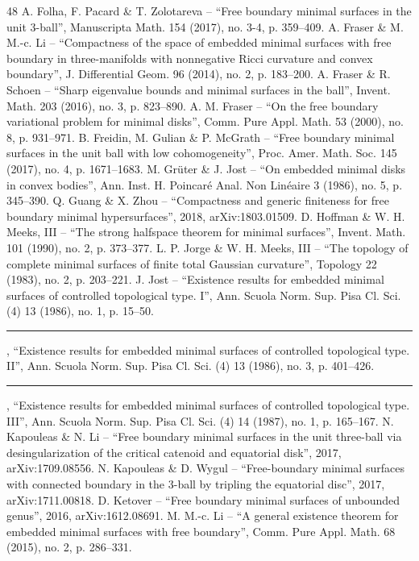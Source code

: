 \documentclass[10pt]{article}
\theoremstyle{definition}\newtheorem{definition}[thm]{Definition}
\numberwithin{equation}{section}
\begin{document}
\begin{thebibliography}{48}
 A. Folha, F. Pacard \& T. Zolotareva – “Free boundary minimal surfaces in the unit 3-ball”, Manuscripta Math. 154 (2017), no. 3-4, p. 359–409.
 A. Fraser \& M. M.-c. Li – “Compactness of the space of embedded minimal surfaces with free boundary in three-manifolds with nonnegative Ricci curvature and convex boundary”, J. Differential Geom. 96 (2014), no. 2, p. 183–200.
 A. Fraser \& R. Schoen – “Sharp eigenvalue bounds and minimal surfaces in the ball”, Invent. Math. 203 (2016), no. 3, p. 823–890.
 A. M. Fraser – “On the free boundary variational problem for minimal disks”, Comm. Pure Appl. Math. 53 (2000), no. 8, p. 931–971.
 B. Freidin, M. Gulian \& P. McGrath – “Free boundary minimal surfaces in the unit ball with low cohomogeneity”, Proc. Amer. Math. Soc. 145 (2017), no. 4, p. 1671–1683.
 M. Grüter \& J. Jost – “On embedded minimal disks in convex bodies”, Ann. Inst. H. Poincaré Anal. Non Linéaire 3 (1986), no. 5, p. 345–390.
 Q. Guang \& X. Zhou – “Compactness and generic ﬁniteness for free boundary minimal hypersurfaces”, 2018, arXiv:1803.01509.
 D. Hoffman \& W. H. Meeks, III – “The strong halfspace theorem for minimal surfaces”, Invent. Math. 101 (1990), no. 2, p. 373–377.
 L. P. Jorge \& W. H. Meeks, III – “The topology of complete minimal surfaces of ﬁnite total Gaussian curvature”, Topology 22 (1983), no. 2, p. 203–221.
 J. Jost – “Existence results for embedded minimal surfaces of controlled topological type. I”, Ann. Scuola Norm. Sup. Pisa Cl. Sci. (4) 13 (1986), no. 1, p. 15–50.
 \rule{2em}{.3pt} , “Existence results for embedded minimal surfaces of controlled topological type. II”, Ann. Scuola Norm. Sup. Pisa Cl. Sci. (4) 13 (1986), no. 3, p. 401–426.
 \rule{2em}{.3pt} , “Existence results for embedded minimal surfaces of controlled topological type. III”, Ann. Scuola Norm. Sup. Pisa Cl. Sci. (4) 14 (1987), no. 1, p. 165–167.
 N. Kapouleas \& N. Li – “Free boundary minimal surfaces in the unit three-ball via desingularization of the critical catenoid and equatorial disk”, 2017, arXiv:1709.08556.
 N. Kapouleas \& D. Wygul – “Free-boundary minimal surfaces with connected boundary in the 3-ball by tripling the equatorial disc”, 2017, arXiv:1711.00818.
 D. Ketover – “Free boundary minimal surfaces of unbounded genus”, 2016, arXiv:1612.08691.
 M. M.-c. Li – “A general existence theorem for embedded minimal surfaces with free boundary”, Comm. Pure Appl. Math. 68 (2015), no. 2, p. 286–331.

\end{thebibliography}
\end{document}
